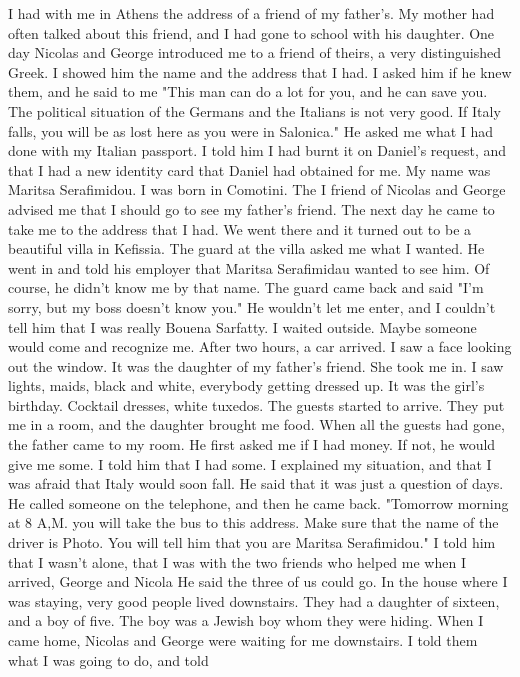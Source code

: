 I had with me in Athens the address of a friend of my father's. 
My mother had often talked about this friend, and I had gone to school
with his daughter. One day Nicolas and George introduced me to a friend 
of theirs, a very distinguished Greek. I showed him the name and the 
address that I had. I asked him if he knew them, and he said to me 
"This man can do a lot for you, and he can save you. The political situation of the Germans and the Italians is not very good. If Italy falls, you will be as lost here as you were in Salonica." He asked me what I had done with my Italian passport. I told him I had burnt it on Daniel's 
request, and that I had a new identity card that Daniel had obtained for 
me. My name was Maritsa Serafimidou. I was born in Comotini. The I friend of Nicolas and George advised me that I should go to see my father's 
friend. 
The next day he came to take me to the address that I had. We went 
there and it turned out to be a beautiful villa in Kefissia. The guard 
at the villa asked me what I wanted. He went in and told his employer 
that Maritsa Serafimidau wanted to see him. Of course, he didn't know 
me by that name. The guard came back and said "I'm sorry, but my boss 
doesn't know you." He wouldn't let me enter, and I couldn't tell him 
that I was really Bouena Sarfatty. I waited outside. Maybe someone would 
come and recognize me. After two hours, a car arrived. I saw a face 
looking out the window. It was the daughter of my father's friend. She 
took me in. I saw lights, maids, black and white, everybody getting 
dressed up. It was the girl's birthday. Cocktail dresses, white tuxedos. 
The guests started to arrive. 
They put me in a room, and the daughter brought me food. When all 
the guests had gone, the father came to my room. He first asked me if 
I had money. If not, he would give me some. I told him that I had some. 
I explained my situation, and that I was afraid that Italy would soon 
fall. He said that it was just a question of days. He called someone 
on the telephone, and then he came back. "Tomorrow morning at 8 A,M. 
you will take the bus to this address. Make sure that the name of the 
driver is Photo. You will tell him that you are Maritsa Serafimidou." 
I told him that I wasn't alone, that I was with the two friends who helped 
me when I arrived, George and Nicola He said the three of us could go. 
In the house where I was staying, very good people lived downstairs. 
They had a daughter of sixteen, and a boy of five. The boy was a Jewish 
boy whom they were hiding. When I came home, Nicolas and George were 
waiting for me downstairs. I told them what I was going to do, and told 
